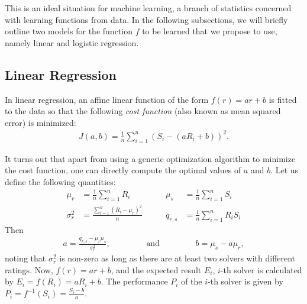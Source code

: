 \documentclass{article}
\newcommand{\artg}{\mu_r}
\newcommand{\ascr}{\mu_s}
\newcommand{\vrtg}{\sigma_r^2}
\newcommand{\cov}{q_{r,s}}
\begin{document}
This is an ideal situation for machine learning, a branch of statistics concerned with learning functions from data.
In the following subsections, we will briefly outline two models for the function $f$ to be learned that we propose to use, namely linear and logistic regression.

\subsection{Linear Regression}
In linear regression, an affine linear function of the form $f(r)=ar+b$ is fitted to the data so that the following \emph{cost function} (also known as mean squared error) is minimized:
\begin{align}
J(a,b)=\frac{1}{n}\sum_{i=1}^n(S_i-(aR_i+b))^2.
\end{align}

It turns out that apart from using a generic optimization algorithm to minimize the cost function, one can directly compute the optimal values of $a$ and $b$.
Let us define the following quantities:
\begin{align}
\artg&=\frac{1}{n}\sum_{i=1}^n R_i\qquad & \ascr&=\frac{1}{n}\sum_{i=1}^n S_i\\
\vrtg&=\frac{\sum_{i=1}^n (R_i-\artg)^2}{n}\qquad & \cov&=\frac{1}{n}\sum_{i=1}^n R_iS_i
\end{align}
Then
\begin{align}\label{linreg:ab}
a=\frac{\cov-\artg\ascr}{\vrtg},\qquad\qquad\text{ and }\qquad\qquad b=\ascr-a\artg,
\end{align}
noting that $\vrtg$ is non-zero as long as there are at least two solvers with different ratings.
Now, $f(r)=ar+b$, and the expected result $E_i$, $i$-th solver is calculated by $E_i=f(R_i)=aR_i+b$.
The performance $P_i$ of the $i$-th solver is given by $P_i=f^{-1}(S_i)=\frac{S_i-b}{a}$.
\end{document}
